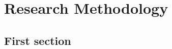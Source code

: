 \chapter{Research Methodology} \label{chap:methods}
\lipsum[12]

\section{First section}
\lipsum[13-19]